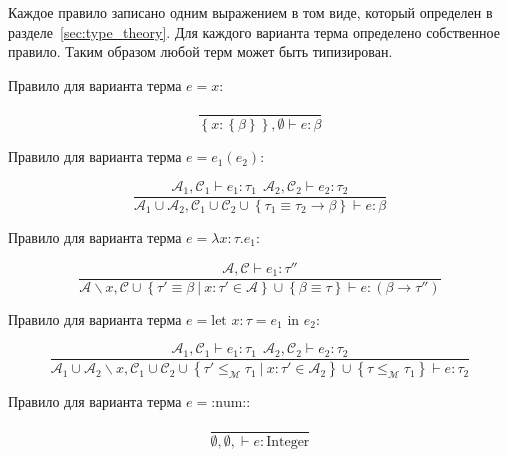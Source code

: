 Каждое правило записано одним выражением в том виде, который определен в разделе~\ref{sec:type_theory}.
Для каждого варианта терма определено собственное правило.
Таким образом любой терм может быть типизирован.

Правило для варианта терма $e = x$:

\begin{equation}
    \label{eq:var_infer}
    \frac{}{\left\{ x: \left\{ \beta \right\} \right\}, \emptyset \vdash e: \beta}
\end{equation}

Правило для варианта терма $e = e_1(e_2)$:

\begin{equation}
    \label{eq:app_infer}
    \frac{
        \mathcal{A}_1, \mathcal{C}_1 \vdash e_1: \tau_1 ~~ \mathcal{A}_2, \mathcal{C}_2 \vdash e_2: \tau_2
    }{
        \mathcal{A}_1 \cup \mathcal{A}_2, \mathcal{C}_1 \cup \mathcal{C}_2 \cup \left\{ \tau_1 \equiv \tau_2 \to \beta \right\} \vdash e: \beta
    }
\end{equation}

Правило для варианта терма $e = \lambda x: \tau. e_1$:

\begin{equation}
    \label{eq:abs_infer}
    \frac{
        \mathcal{A}, \mathcal{C} \vdash e_1: \tau''
    }{
        \mathcal{A} \backslash x, \mathcal{C} \cup \left\{ \tau' \equiv \beta ~|~ x: \tau' \in \mathcal{A} \right\} \cup \left\{ \beta \equiv \tau \right\} \vdash e: (\beta \to \tau'')
    }
\end{equation}

Правило для варианта терма $e = \text{let } x: \tau = e_1 \text{ in } e_2$:

\begin{equation}
    \label{eq:let_infer}
    \frac{
        \mathcal{A}_1, \mathcal{C}_1 \vdash e_1: \tau_1 ~~ \mathcal{A}_2, \mathcal{C}_2 \vdash e_2: \tau_2
    }{
        \mathcal{A}_1 \cup \mathcal{A}_2 \backslash x, \mathcal{C}_1 \cup \mathcal{C}_2 \cup \left\{ \tau' \leq_{\mathcal{M}} \tau_1 ~|~ x: \tau' \in \mathcal{A}_2 \right\} \cup \left\{ \tau \leq_{\mathcal{M}} \tau_1 \right\} \vdash e: \tau_2
    }
\end{equation}

Правило для варианта терма $e = \text{:num:}$:

\begin{equation}
    \label{eq:num_infer}
    \frac{}{\emptyset, \emptyset, \vdash e: \text{Integer}}
\end{equation}

